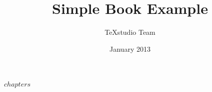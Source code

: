 \documentclass[a4paper,12pt]{book}
\begin{document}
\author{TeXstudio Team}
\title{Simple Book Example}
\date{January 2013}

\frontmatter
\maketitle
\tableofcontents

\mainmatter

$chapters$

\backmatter
\end{document}
